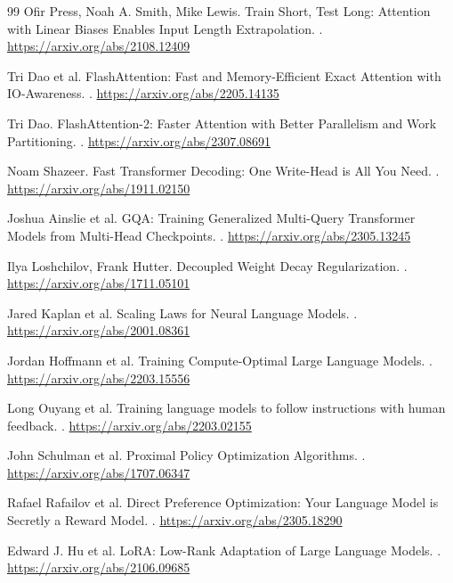 \documentclass[UTF8,12pt]{ctexart}
\newcommand{\1}{\mathbf{1}}
\begin{document}
\begin{thebibliography}{99}
Ofir Press, Noah A. Smith, Mike Lewis.
\newblock Train Short, Test Long: Attention with Linear Biases Enables Input Length Extrapolation.
.
\newblock \url{https://arxiv.org/abs/2108.12409}

Tri Dao et al.
\newblock FlashAttention: Fast and Memory-Efficient Exact Attention with IO-Awareness.
.
\newblock \url{https://arxiv.org/abs/2205.14135}

Tri Dao.
\newblock FlashAttention-2: Faster Attention with Better Parallelism and Work Partitioning.
.
\newblock \url{https://arxiv.org/abs/2307.08691}

Noam Shazeer.
\newblock Fast Transformer Decoding: One Write-Head is All You Need.
.
\newblock \url{https://arxiv.org/abs/1911.02150}

Joshua Ainslie et al.
\newblock GQA: Training Generalized Multi-Query Transformer Models from Multi-Head Checkpoints.
.
\newblock \url{https://arxiv.org/abs/2305.13245}

Ilya Loshchilov, Frank Hutter.
\newblock Decoupled Weight Decay Regularization.
.
\newblock \url{https://arxiv.org/abs/1711.05101}

Jared Kaplan et al.
\newblock Scaling Laws for Neural Language Models.
.
\newblock \url{https://arxiv.org/abs/2001.08361}

Jordan Hoffmann et al.
\newblock Training Compute-Optimal Large Language Models.
.
\newblock \url{https://arxiv.org/abs/2203.15556}

Long Ouyang et al.
\newblock Training language models to follow instructions with human feedback.
.
\newblock \url{https://arxiv.org/abs/2203.02155}

John Schulman et al.
\newblock Proximal Policy Optimization Algorithms.
.
\newblock \url{https://arxiv.org/abs/1707.06347}

Rafael Rafailov et al.
\newblock Direct Preference Optimization: Your Language Model is Secretly a Reward Model.
.
\newblock \url{https://arxiv.org/abs/2305.18290}

Edward J. Hu et al.
\newblock LoRA: Low-Rank Adaptation of Large Language Models.
.
\newblock \url{https://arxiv.org/abs/2106.09685}


\end{thebibliography}
\end{document}
